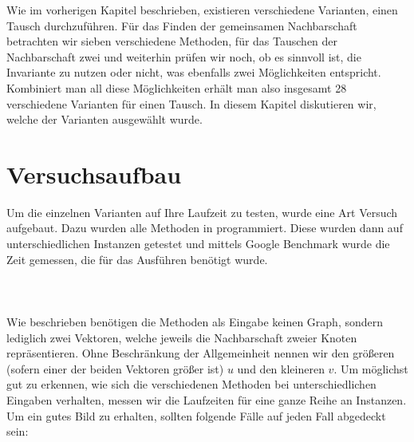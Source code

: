 
Wie im vorherigen Kapitel beschrieben, existieren verschiedene Varianten, einen \gc Tausch 
durchzuführen. Für das Finden der gemeinsamen Nachbarschaft betrachten wir sieben verschiedene Methoden, 
für das Tauschen der Nachbarschaft zwei und weiterhin prüfen wir noch, ob es sinnvoll ist, 
die  Invariante zu nutzen oder nicht, was ebenfalls zwei Möglichkeiten entspricht.
Kombiniert man all diese Möglichkeiten erhält man also insgesamt 28 verschiedene Varianten für einen \gc 
Tausch.
In diesem Kapitel diskutieren wir, welche der Varianten ausgewählt wurde.

\section{Versuchsaufbau}
Um die einzelnen Varianten auf Ihre Laufzeit zu testen, wurde eine Art Versuch aufgebaut.
Dazu wurden alle Methoden in \cpp programmiert. Diese wurden dann auf unterschiedlichen
Instanzen getestet und mittels Google Benchmark \cite{benchmark} wurde die Zeit gemessen, 
die für das Ausführen benötigt wurde.
\\
\\
\\
\\
Wie %
beschrieben benötigen die Methoden als Eingabe keinen Graph, 
sondern lediglich zwei Vektoren, welche jeweils die Nachbarschaft zweier Knoten repräsentieren. Ohne 
Beschränkung der Allgemeinheit nennen wir den größeren (sofern einer der beiden Vektoren größer ist)
$u$ und den kleineren $v$.
Um möglichst gut zu erkennen, wie sich die verschiedenen Methoden bei unterschiedlichen
Eingaben verhalten, messen wir die Laufzeiten für eine ganze Reihe an Instanzen. 
Um ein gutes Bild zu erhalten, sollten folgende Fälle auf jeden Fall abgedeckt sein:

